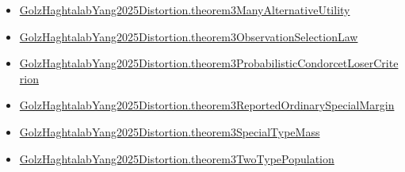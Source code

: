 \documentclass[10pt]{article}
\begin{document}
\begin{itemize}
\item \hyperlink{governing-declaration-bfef2d422eb25497}{Golz\allowbreak{}Haghtalab\allowbreak{}Yang2025\allowbreak{}Distortion.\allowbreak{}theorem3\allowbreak{}Many\allowbreak{}Alternative\allowbreak{}Utility}
\item \hyperlink{governing-declaration-f48897680b4251cd}{Golz\allowbreak{}Haghtalab\allowbreak{}Yang2025\allowbreak{}Distortion.\allowbreak{}theorem3\allowbreak{}Observation\allowbreak{}Selection\allowbreak{}Law}
\item \hyperlink{governing-declaration-fa9a73ecc3173034}{Golz\allowbreak{}Haghtalab\allowbreak{}Yang2025\allowbreak{}Distortion.\allowbreak{}theorem3\allowbreak{}Probabilistic\allowbreak{}Condorcet\allowbreak{}Loser\allowbreak{}Criterion}
\item \hyperlink{governing-declaration-5e11e0b8b649abae}{Golz\allowbreak{}Haghtalab\allowbreak{}Yang2025\allowbreak{}Distortion.\allowbreak{}theorem3\allowbreak{}Reported\allowbreak{}Ordinary\allowbreak{}Special\allowbreak{}Margin}
\item \hyperlink{governing-declaration-d300ff02fbceb879}{Golz\allowbreak{}Haghtalab\allowbreak{}Yang2025\allowbreak{}Distortion.\allowbreak{}theorem3\allowbreak{}Special\allowbreak{}Type\allowbreak{}Mass}
\item \hyperlink{governing-declaration-5256b014ca2f6f1b}{Golz\allowbreak{}Haghtalab\allowbreak{}Yang2025\allowbreak{}Distortion.\allowbreak{}theorem3\allowbreak{}Two\allowbreak{}Type\allowbreak{}Population}
\end{itemize}
\end{document}

